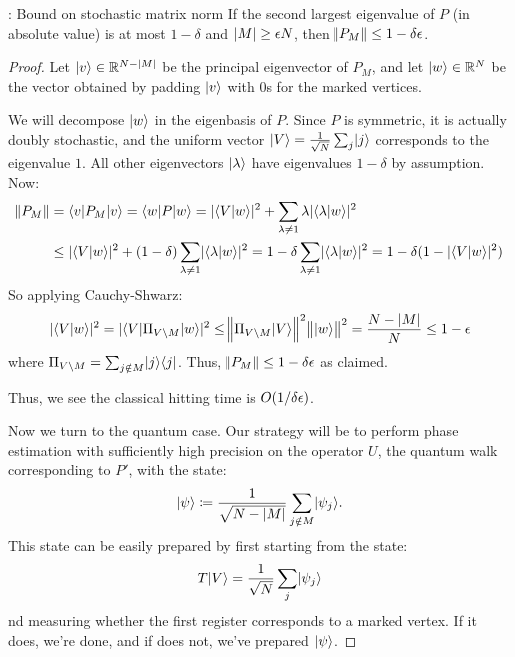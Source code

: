 \begin{lembox}{: Bound on stochastic matrix norm}
    If the second largest eigenvalue of $P$ (in absolute value) is at most $1 - \delta$ and $\lvert M \rvert \geq \epsilon N$, then $\norm{P_M} \leq 1 - \delta \epsilon$. 
\end{lembox}
\begin{proof}
    Let $\lvert v \rangle \in \mathbb{R}^{N-\lvert M \rvert}$ be the principal eigenvector of $P_M$, and let $\lvert w \rangle \in \mathbb{R}^N$ be the vector obtained by padding $\lvert v \rangle$ with 0s for the marked vertices.

    We will decompose $\lvert w \rangle$ in the eigenbasis of $P$. Since $P$ is symmetric, it is actually doubly stochastic, and the uniform vector $\lvert V \rangle = \frac{1}{\sqrt{N}}\sum_j \lvert j \rangle$ corresponds to the eigenvalue $1$. All other eigenvectors $\lvert \lambda \rangle$ have eigenvalues $1 - \delta$ by assumption. Now:
    \begin{align*}
        \norm{P_M} &= \langle v \rvert P_M\lvert v \rangle = \langle w \rvert P\lvert w \rangle = \lvert \langle V \lvert w \rangle \rvert^2 + \sum_{\lambda \neq 1}\lambda\lvert \langle \lambda \lvert w \rangle \rvert^2 
        \\ &\leq \lvert \langle V \lvert w \rangle \rvert^2 + (1-\delta)\sum_{\lambda \neq 1}\lvert \langle \lambda \lvert w \rangle \rvert^2 = 1 - \delta\sum_{\lambda \neq 1}\lvert \langle \lambda \lvert w \rangle \rvert^2 = 1 - \delta(1 - \lvert \langle V \lvert w \rangle \rvert^2)
    \end{align*}
    So applying Cauchy-Shwarz:
    \begin{equation}
        \lvert \langle V \lvert w \rangle \rvert^2 = \lvert \langle V \rvert\Pi_{V \setminus M}\lvert w \rangle \rvert^2 \leq \norm{\Pi_{V \setminus M}\lvert V \rangle}^2 \norm{\lvert w \rangle}^2 = \frac{N - \lvert M \rvert}{N} \leq 1 - \epsilon
    \end{equation}
    where $\Pi_{V \setminus M} = \sum_{j \notin M}\lvert j \rangle \langle j \rvert$. Thus, $\norm{P_M} \leq 1 - \delta \epsilon$ as claimed.

    Thus, we see the classical hitting time is $O(1/\delta\epsilon)$.

    Now we turn to the quantum case. Our strategy will be to perform phase estimation with sufficiently high precision on the operator $U$, the quantum walk corresponding to $P'$, with the state:
    \begin{equation}
        \lvert \psi \rangle \coloneqq \frac{1}{\sqrt{N-\lvert M \rvert}}\sum_{j \notin M}\lvert \psi_j \rangle.
    \end{equation}
    This state can be easily prepared by first starting from the state:
    \begin{equation}
        T\lvert V \rangle = \frac{1}{\sqrt{N}}\sum_j \lvert \psi_j \rangle
    \end{equation}
    nd measuring whether the first register corresponds to a marked vertex. If it does, we're done, and if does not, we've prepared $\lvert \psi \rangle$.


\end{proof}
